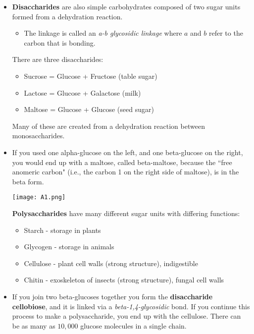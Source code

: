 \documentclass[letterpaper]{article}
\begin{document}
\begin{itemize}
    \item \textbf{Disaccharides} are also simple carbohydrates composed of two sugar units formed from a dehydration reaction.
    
    \begin{itemize}
        \item The linkage is called an \textit{a-b glycosidic linkage} where $a$ and $b$ refer to the carbon that is bonding.
    \end{itemize}
    \begin{idea}
        There are three disaccharides:
        \begin{itemize}
            \item Sucrose = Glucose + Fructose (table sugar)
            \item Lactose = Glucose + Galactose (milk)
            \item Maltose = Glucose + Glucose (seed sugar)
        \end{itemize}
        Many of these are created from a dehydration reaction between monosaccharides.
        \end{idea}
    \item If you used one alpha-glucose on the left, and one beta-glucose on the right, you would end up with a maltose, called beta-maltose, because the ``free anomeric carbon" (i.e., the carbon 1 on the right side of maltose), is in the beta form.
    \begin{center}\texttt{[image: A1.png]}\end{center}
    \begin{idea}
        \textbf{Polysaccharides} have many different sugar units with differing functions:
        \begin{itemize}
            \item Starch - storage in plants
            \item Glycogen - storage in animals
            \item Cellulose - plant cell walls (strong structure), indigestible
            \item Chitin - exoskeleton of insects (strong structure), fungal cell walls
        \end{itemize}
    \end{idea}
    \item If you join two beta-glucoses together you form the \textbf{disaccharide cellobiose}, and it is linked via a \textit{beta-1,4-glycosidic} bond. If you continue this process to make a polysaccharide, you end up with the cellulose. There can be as many as $10,000$ glucose molecules in a single chain.

\end{itemize}
\end{document}
